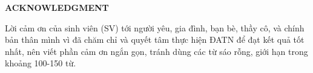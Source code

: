 \documentclass[../main.tex]{subfiles}
\begin{document}
\begin{center}
    \Large{\textbf{ACKNOWLEDGMENT}}\\
\end{center}
\vspace{1cm}
Lời cảm ơn của sinh viên (SV) tới người yêu, gia đình, bạn bè, thầy cô, và chính bản thân mình vì đã chăm chỉ và quyết tâm thực hiện ĐATN để đạt kết quả tốt nhất, nên viết phần cảm ơn ngắn gọn, tránh dùng các từ sáo rỗng, giới hạn trong khoảng 100-150 từ. 
\end{document}
